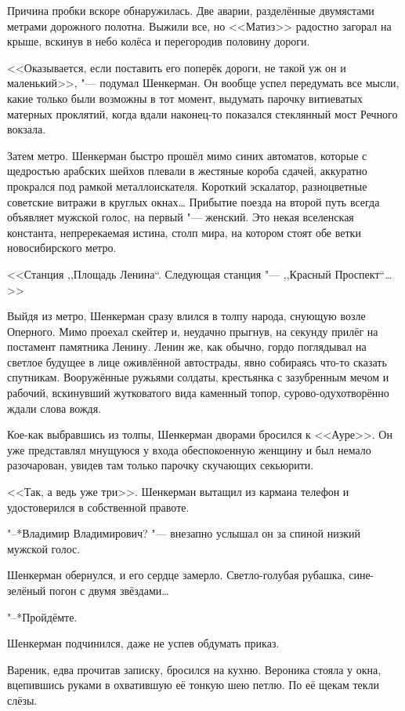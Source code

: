 Причина пробки вскоре обнаружилась.
Две аварии, разделённые двумястами метрами дорожного полотна.
Выжили все, но <<Матиз>> радостно загорал на крыше, вскинув в небо колёса и перегородив половину дороги.

<<Оказывается, если поставить его поперёк дороги, не такой уж он и маленький>>, "--- подумал Шенкерман.
Он вообще успел передумать все мысли, какие только были возможны в тот момент, выдумать парочку витиеватых матерных проклятий, когда вдали наконец-то показался стеклянный мост Речного вокзала.

Затем метро.
Шенкерман быстро прошёл мимо синих автоматов, которые с щедростью арабских шейхов плевали в жестяные короба сдачей, аккуратно прокрался под рамкой металлоискателя.
Короткий эскалатор, разноцветные советские витражи в круглых окнах\ldots{}
Прибытие поезда на второй путь всегда объявляет мужской голос, на первый "--- женский.
Это некая вселенская константа, непререкаемая истина, столп мира, на котором стоят обе ветки новосибирского метро.

<<Станция ,,Площадь Ленина``. Следующая станция "--- ,,Красный Проспект``\ldots{}>>

Выйдя из метро, Шенкерман сразу влился в толпу народа, снующую возле Оперного.
Мимо проехал скейтер и, неудачно прыгнув, на секунду прилёг на постамент памятника Ленину.
Ленин же, как обычно, гордо поглядывал на светлое будущее в лице оживлённой автострады, явно собираясь что-то сказать спутникам.
Вооружённые ружьями солдаты, крестьянка с зазубренным мечом и рабочий, вскинувший жутковатого вида каменный топор, сурово-одухотворённо ждали слова вождя.

Кое-как выбравшись из толпы, Шенкерман дворами бросился к <<Ауре>>.
Он уже представлял мнущуюся у входа обеспокоенную женщину и был немало разочарован, увидев там только парочку скучающих секьюрити.

<<Так, а ведь уже три>>.
Шенкерман вытащил из кармана телефон и удостоверился в собственной правоте.

"--*Владимир Владимирович? "--- внезапно услышал он за спиной низкий мужской голос.

Шенкерман обернулся, и его сердце замерло.
Светло-голубая рубашка, сине-зелёный погон с двумя звёздами\ldots{}

"--*Пройдёмте.

Шенкерман подчинился, даже не успев обдумать приказ.

\asterism

Вареник, едва прочитав записку, бросился на кухню.
Вероника стояла у окна, вцепившись руками в охватившую её тонкую шею петлю.
По её щекам текли слёзы.

